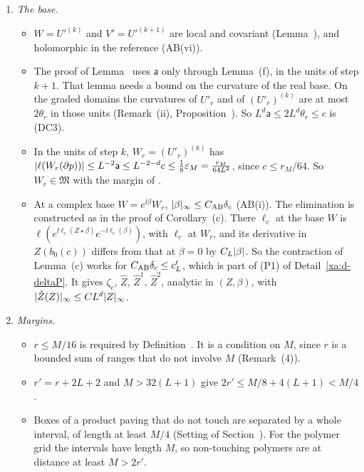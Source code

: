 \begin{detail}
\begin{enumerate}[label=(\alph*)]
The two readings of $\xaabs{\cdot}_*$, with respect to $U'_r$ and to $U'$, differ by a local term of size $C\delta_c\xaabs{A}$. Indeed $D_{U'}-D_{U'_r}=T_\delta$ is local, of size $C\delta$ with $\delta=C_{\rm cmp}\delta_c$, by the proof of Proposition~ and Detail~\ref{xa:d-cmp}.
\item \emph{The base.}
  \begin{itemize}
  \item $W=U'^{(k)}$ and $V'=U'^{(k+1)}$ are local and covariant (Lemma~), and holomorphic in the reference (AB(vi)).
  \item The proof of Lemma~ uses $\mathsf a$ only through Lemma~(f), in the units of step $k+1$. That lemma needs a bound on the curvature of the real base. On the graded domains the curvatures of $U'_r$ and of $(U'_r)^{(k)}$ are at most $2\theta_r$ in those units (Remark~(ii), Proposition~). So $L^d\mathsf a\le2L^d\theta_r\le c$ is (DC3).
  \item In the units of step $k$, $W_r=(U'_r)^{(k)}$ has $\lvert\ell(W_r(\partial p))\rvert\le L^{-2}\mathsf a\le L^{-2-d}c\le\frac18\varepsilon_M=\frac{r_M}{64L^2}$, since $c\le r_M/64$. So $W_r\in\mathfrak M$ with the margin of .
  \item At a complex base $W=e^{\ii\beta}W_r$, $\lvert\beta\rvert_\infty\le C_{\rm AB}\delta_c$ (AB(i)). The elimination is constructed as in the proof of Corollary~(c). There $\ell_c$ at the base $W$ is $\ell(e^{\ii\ell_c(Z\star\beta)}e^{-\ii\ell_c(\beta)})$, with $\ell_c$ at $W_r$, and its derivative in $Z(b_0(c))$ differs from that at $\beta=0$ by $C_L\lvert\beta\rvert$. So the contraction of Lemma~(c) works for $C_{\rm AB}\delta_c\le c'_L$, which is part of (P1) of Detail~\ref{xa:d-deltaP}. It gives $\zeta_c$, $\hat Z$, $\hat Z^1$, $\hat Z^2$, analytic in $(Z,\beta)$, with $\lvert\hat Z(Z)\rvert_\infty\le CL^d\lvert Z\rvert_\infty$.
  \end{itemize}
\item \emph{Margins.}
  \begin{itemize}
  \item $r\le M/16$ is required by Definition~. It is a condition on $M$, since $r$ is a bounded sum of ranges that do not involve $M$ (Remark~(4)).
  \item $r'=r+2L+2$ and $M>32(L+1)$ give $2r'\le M/8+4(L+1)<M/4$.
  \item Boxes of a product paving that do not touch are separated by a whole interval, of length at least $M/4$ (Setting of Section~). For the polymer grid the intervals have length $M$, so non-touching polymers are at distance at least $M>2r'$.

\end{itemize}
\end{enumerate}
\end{detail}
